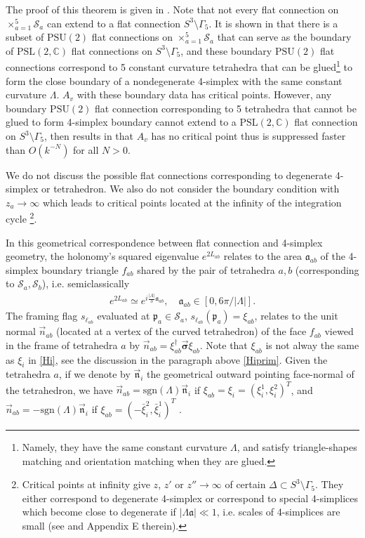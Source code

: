 \documentclass[aps,prd,notitlepage,nofootinbib,superscriptaddress,groupedaddress,twocolumn]{revtex4-1}
\def\sgn{\text{sgn}}
\newcommand{\PSlc}{\mathrm{PSL}(2,\mathbb{C})}
\newcommand{\PSu}{\mathrm{PSU}(2)}
\def\be{\begin{eqnarray}}
\def\ee{\end{eqnarray}}
\newcommand{\cs}{\mathcal S}
\newcommand{\fa}{\mathfrak{a}}  \newcommand{\Fa}{\mathfrak{A}}
\newcommand{\fn}{\mathfrak{n}}  \newcommand{\Fn}{\mathfrak{N}}
\newcommand{\fp}{\mathfrak{p}}  \newcommand{\Fp}{\mathfrak{P}}
\newcommand{\G}{\Gamma}
\newcommand{\sig}{\sigma}
\renewcommand{\L }{\Lambda}
\begin{document}
The proof of this theorem is given in \cite{HHKR}. Note that not every flat connection on $\times_{a=1}^5\cs_a$ can extend to a flat connection $S^3\setminus\G_5$. It is shown in \cite{HHKR} that there is a subset of $\PSu$ flat connections on $\times_{a=1}^5\cs_a$ that can serve as the boundary of $\PSlc$ flat connections on $S^3\setminus\G_5$, and these boundary $\PSu$ flat connections correspond to 5 constant curvature tetrahedra that can be glued\footnote{Namely, they have the same constant curvature $\L$, and satisfy triangle-shapes matching and orientation matching when they are glued. } to form the close boundary of a nondegenerate 4-simplex with the same constant curvature $\L$. $A_v$ with these boundary data has critical points. However, any boundary $\PSu$ flat connection corresponding to 5 tetrahedra that cannot be glued to form 4-simplex boundary cannot extend to a $\PSlc$ flat connection on $S^3\setminus\G_5$, then results in that $A_v$ has no critical point thus is suppressed faster than $O(k^{-N})$ for all $N>0$. 

We do not discuss the possible flat connections corresponding to degenerate 4-simplex or tetrahedron. We also do not consider the boundary condition with $z_a\to\infty$ which leads to critical points located at the infinity of the integration cycle \footnote{Critical points at infinity give $z$, $z'$ or $z''\to\infty$ of certain $\Delta\subset S^3\setminus\G_5$. They either correspond to degenerate 4-simplex or correspond to special 4-simplices which become close to degenerate if $|\L\fa|\ll 1$, i.e. scales of 4-simplices are small (see \cite{hanSUSY} and Appendix E therein).}. 

In this geometrical correspondence between flat connection and 4-simplex geometry, the holonomy's squared eigenvalue $e^{2L_{ab}}$ relates to the area $\fa_{ab}$ of the 4-simplex boundary triangle $f_{ab}$ shared by the pair of tetrahedra $a,b$ (corresponding to $\cs_a,\cs_b$), i.e. semiclassically
\be
e^{2L_{ab}}\simeq e^{i\frac{|\L|}{3}\fa_{ab}},\quad \fa_{ab}\in[0,6\pi/|\L|]. \label{Landfa}
\ee
The framing flag $s_{\ell_{ab}}$ evaluated at $\fp_a\in\cs_a$, $s_{\ell_{ab}}(\fp_a)=\xi_{ab}$, relates to the unit normal $\vec{n}_{ab}$ (located at a vertex of the curved tetrahedron) of the face $f_{ab}$ viewed in the frame of tetrahedra $a$ by $\vec{n}_{ab}=\xi_{ab}^\dagger\vec{\bm{\sig}}\xi_{ab}$. Note that $\xi_{ab}$ is not alway the same as $\xi_i$ in \eqref{Hi}, see the discussion in the paragraph above \eqref{Hiprim}. Given the tetrahedra $a$, if we denote by $\vec{\fn}_i$ the geometrical outward pointing face-normal of the tetrahedron, we have $\vec{n}_{ab}=\sgn(\L)\vec{\fn}_i$ if $\xi_{ab}=\xi_i=(\xi_i^1,\xi_i^2)^T$, and $\vec{n}_{ab}=-\sgn(\L)\vec{\fn}_i$ if $\xi_{ab}=(-\bar{\xi}^2_i,\bar{\xi}^1_i)^T$ \cite{3dblockHHKR}.
\end{document}
